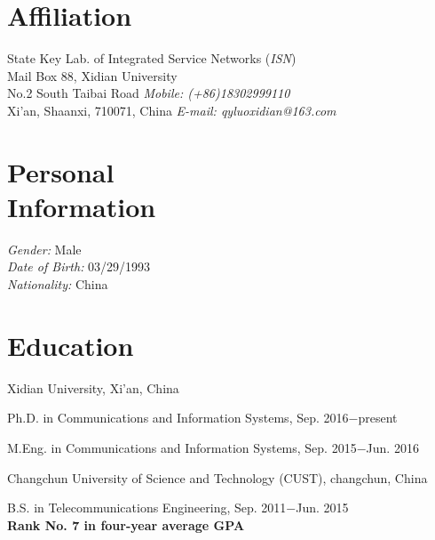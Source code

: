 \documentclass[margin,line]{resume}
\begin{document}
    \begin{resume}
    \section{\mysidestyle Affiliation}
    State Key Lab. of Integrated Service Networks (\textsl{ISN})  \\
    Mail Box 88, Xidian University       \\
    No.2 South Taibai Road             \hfill \textsl{Mobile: (+86)18302999110}     \\
    Xi'an, Shaanxi, 710071, China      \hfill \textsl{E-mail: qyluoxidian@163.com}
    \vspace{-0mm}
    \section{\mysidestyle Personal\\Information}
    \textsl{Gender:} Male \\
    \textsl{Date of Birth:} 03/29/1993 \\
    \textsl{Nationality:} China
    \section{\mysidestyle Education}
     Xidian University, Xi'an, China
    \begin{list2}
    \item  Ph.D. in Communications and Information Systems, Sep. 2016$-$present
    \item  M.Eng. in Communications and Information Systems, Sep. 2015$-$Jun. 2016
    \end{list2}\vspace{-3mm}
    Changchun University of Science and Technology (CUST), changchun, China
    \begin{list2}
    \item  B.S. in Telecommunications Engineering, Sep. 2011$-$Jun. 2015 \\
        \textbf{Rank No. 7 in four-year average GPA }
    \end{list2}
    \vspace{-0mm}

\end{resume}
\end{document}
